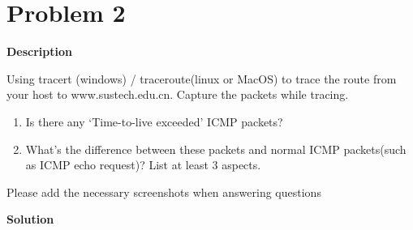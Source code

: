 \documentclass[12pt,letterpaper]{ctexart}
\begin{document}
\newpage

\section*{Problem 2}

{\bf Description}

Using tracert (windows) / traceroute(linux or MacOS) to trace the route from your host to www.sustech.edu.cn. Capture the packets while tracing.

\begin{enumerate}
  \item Is there any ‘Time-to-live exceeded’ ICMP packets?
  \item What’s the difference between these packets and normal ICMP packets(such as ICMP echo request)? List at least 3 aspects.
\end{enumerate}

Please add the necessary screenshots when answering questions



{\bf Solution}
\end{document}
